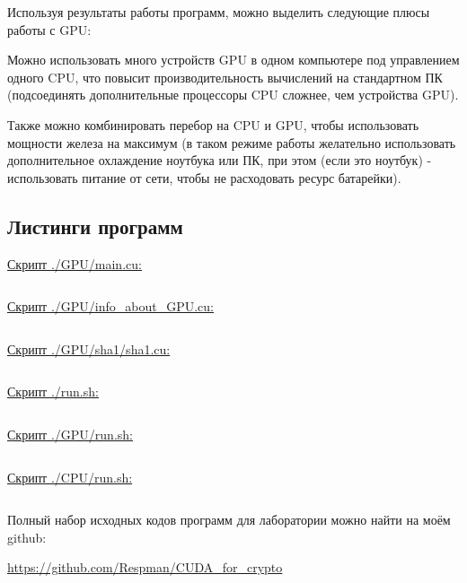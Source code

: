\documentclass[12pt,a4paper]{scrartcl}
\begin{document}
Используя результаты работы программ, можно выделить следующие плюсы работы с GPU:

Можно использовать много устройств GPU в одном компьютере под управлением одного CPU, что повысит производительность вычислений на стандартном ПК (подсоединять дополнительные процессоры CPU сложнее, чем устройства GPU).

Также можно комбинировать перебор на CPU и GPU, чтобы использовать мощности железа на максимум
(в таком режиме работы желательно использовать дополнительное охлаждение ноутбука или ПК, при этом (если это ноутбук) - использовать питание от сети, чтобы не расходовать ресурс батарейки).

\subsection{Листинги программ}



\underline{Скрипт ./GPU/main.cu:}

\inputminted[tabsize=4,obeytabs,fontsize=\footnotesize]{cuda}{../GPU/main.cu}

\underline{Скрипт ./GPU/info\_about\_GPU.cu:}

\inputminted[tabsize=4,obeytabs,fontsize=\footnotesize]{cuda}{../GPU/info_about_GPU.cu}

\underline{Скрипт ./GPU/sha1/sha1.cu:}

\inputminted[tabsize=4,obeytabs,fontsize=\footnotesize]{cuda}{../GPU/sha1/sha1.cu}

\underline{Скрипт ./run.sh:}

\inputminted[tabsize=4,obeytabs,fontsize=\footnotesize]{bash}{../run.sh}

\underline{Скрипт ./GPU/run.sh:}

\inputminted[tabsize=4,obeytabs,fontsize=\footnotesize]{bash}{../GPU/run.sh}

\underline{Скрипт ./CPU/run.sh:}

\inputminted[tabsize=4,obeytabs,fontsize=\footnotesize]{bash}{../CPU/run.sh}

Полный набор исходных кодов программ для лаборатории можно найти на моём github:

\href{https://github.com/Respman/CUDA_for_crypto}{https://github.com/Respman/CUDA\_for\_crypto}
\end{document}
